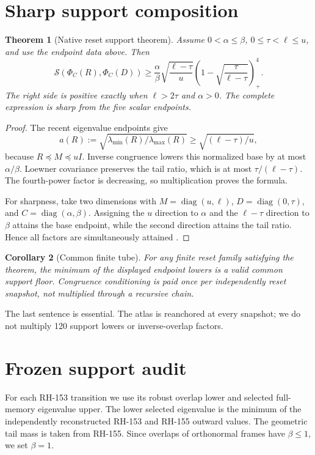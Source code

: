 \documentclass[12pt]{article}
\newtheorem{theorem}{Theorem}
\newtheorem{corollary}[theorem]{Corollary}
\begin{document}
\section{Sharp support composition}
\begin{theorem}[Native reset support theorem]\label{thm:support}
Assume $0<\alpha\leq\beta$, $0\leq\tau<\ell\leq u$, and use the endpoint
data above.  Then
\[
 \mathcal S(\Phi_C(R),\Phi_C(D))\geq
 \frac{\alpha}{\beta}
 \sqrt{\frac{\ell-\tau}{u}}
 \left(1-\sqrt{\frac{\tau}{\ell-\tau}}\right)_+^4.
\]
The right side is positive exactly when $\ell>2\tau$ and $\alpha>0$.
The complete expression is sharp from the five scalar endpoints.
\end{theorem}
\begin{proof}
The recent eigenvalue endpoints give
\[
 a(R):=\sqrt{\lambda_{\min}(R)/\lambda_{\max}(R)}
 \geq\sqrt{(\ell-\tau)/u},
\]
because $R\preceq M\preceq uI$.  Inverse congruence lowers this normalized
base by at most $\alpha/\beta$.  Loewner covariance preserves the tail ratio,
which is at most $\tau/(\ell-\tau)$.  The fourth-power factor is decreasing,
so multiplication proves the formula.

For sharpness, take two dimensions with
$M=\operatorname{diag}(u,\ell)$,
$D=\operatorname{diag}(0,\tau)$, and
$C=\operatorname{diag}(\alpha,\beta)$.  Assigning the $u$ direction to
$\alpha$ and the $\ell-\tau$ direction to $\beta$ attains the base endpoint,
while the second direction attains the tail ratio.  Hence all factors are
simultaneously attained \citep{Bhatia1997,HornJohnson2013}.
\end{proof}

\begin{corollary}[Common finite tube]\label{cor:tube}
For any finite reset family satisfying the theorem, the minimum of the
displayed endpoint lowers is a valid common support floor.  Congruence
conditioning is paid once per independently reset snapshot, not multiplied
through a recursive chain.
\end{corollary}

The last sentence is essential.  The atlas is reanchored at every snapshot;
we do not multiply 120 support lowers or inverse-overlap factors.

\section{Frozen support audit}
For each RH-153 transition we use its robust overlap lower and selected
full-memory eigenvalue upper.  The lower selected eigenvalue is the minimum
of the independently reconstructed RH-153 and RH-155 outward values.  The
geometric tail mass is taken from RH-155.  Since overlaps of orthonormal
frames have $\beta\leq1$, we set $\beta=1$.
\end{document}

